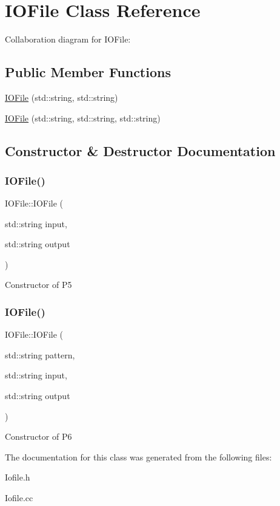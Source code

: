 \hypertarget{classIOFile}{}\section{I\+O\+File Class Reference}
\label{classIOFile}


Collaboration diagram for I\+O\+File\+:
\subsection*{Public Member Functions}
\begin{DoxyCompactItemize}
\item 
\hyperlink{classIOFile_a1a08441371c84205a8704c6ef0811792}{I\+O\+File} (std\+::string, std\+::string)
\item 
\hyperlink{classIOFile_a25f35de90baaae5b5b8553802285806b}{I\+O\+File} (std\+::string, std\+::string, std\+::string)
\end{DoxyCompactItemize}


\subsection{Constructor \& Destructor Documentation}
\mbox{\label{classIOFile_a1a08441371c84205a8704c6ef0811792}} 
\subsubsection{\texorpdfstring{I\+O\+File()}{IOFile()}\hspace{0.1cm}{\footnotesize\ttfamily [1/2]}}
{\footnotesize\ttfamily I\+O\+File\+::\+I\+O\+File (\begin{DoxyParamCaption}\item[{std\+::string}]{input,  }\item[{std\+::string}]{output }\end{DoxyParamCaption})}

Constructor of P5 \mbox{\label{classIOFile_a25f35de90baaae5b5b8553802285806b}} 
\subsubsection{\texorpdfstring{I\+O\+File()}{IOFile()}\hspace{0.1cm}{\footnotesize\ttfamily [2/2]}}
{\footnotesize\ttfamily I\+O\+File\+::\+I\+O\+File (\begin{DoxyParamCaption}\item[{std\+::string}]{pattern,  }\item[{std\+::string}]{input,  }\item[{std\+::string}]{output }\end{DoxyParamCaption})}

Constructor of P6 

The documentation for this class was generated from the following files\+:\begin{DoxyCompactItemize}
\item 
Iofile.\+h\item 
Iofile.\+cc\end{DoxyCompactItemize}
